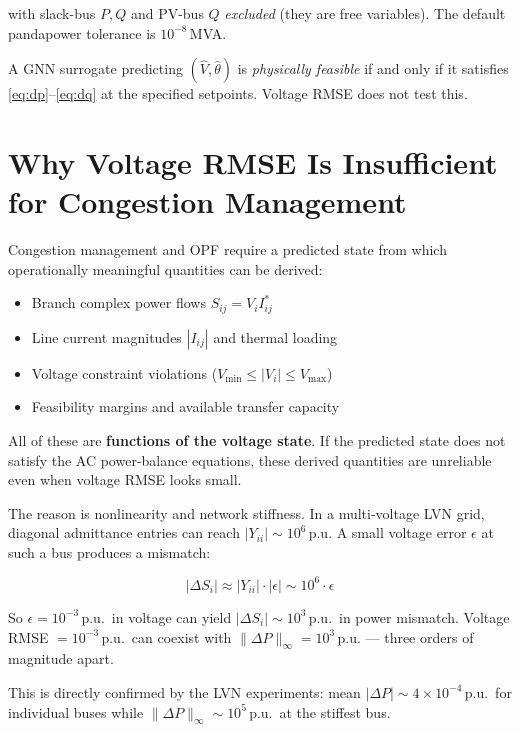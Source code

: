 \documentclass{article}
\begin{document}
with slack-bus $P,Q$ and PV-bus $Q$ \emph{excluded} (they are free variables).
The default pandapower tolerance is $10^{-8}$\,MVA.

A GNN surrogate predicting $(\hat{V}, \hat{\theta})$ is \emph{physically
feasible} if and only if it satisfies \eqref{eq:dp}--\eqref{eq:dq} at the
specified setpoints.  Voltage RMSE does not test this.

\section{Why Voltage RMSE Is Insufficient for Congestion Management}

Congestion management and OPF require a predicted state from which
operationally meaningful quantities can be derived:

\begin{itemize}[noitemsep]
  \item Branch complex power flows $S_{ij} = V_i I_{ij}^*$
  \item Line current magnitudes $|I_{ij}|$ and thermal loading
  \item Voltage constraint violations ($V_{\min} \le |V_i| \le V_{\max}$)
  \item Feasibility margins and available transfer capacity
\end{itemize}

All of these are \textbf{functions of the voltage state}.  If the predicted
state does not satisfy the AC power-balance equations, these derived
quantities are unreliable even when voltage RMSE looks small.

The reason is nonlinearity and network stiffness.  In a multi-voltage LVN
grid, diagonal admittance entries can reach $|Y_{ii}| \sim 10^6$\,p.u.
A small voltage error $\epsilon$ at such a bus produces a mismatch:

\begin{equation}
  |\Delta S_i| \approx |Y_{ii}| \cdot |\epsilon| \sim 10^6 \cdot \epsilon
  \label{eq:stiff}
\end{equation}

So $\epsilon = 10^{-3}$\,p.u.\ in voltage can yield $|\Delta S_i| \sim
10^3$\,p.u.\ in power mismatch.  Voltage RMSE $= 10^{-3}$\,p.u.\ can
coexist with $\|\Delta P\|_\infty = 10^3$\,p.u. --- three orders of
magnitude apart.

This is directly confirmed by the LVN experiments: mean $|\Delta P|
\sim 4 \times 10^{-4}$\,p.u.\ for individual buses while
$\|\Delta P\|_\infty \sim 10^5$\,p.u.\ at the stiffest bus.
\end{document}
